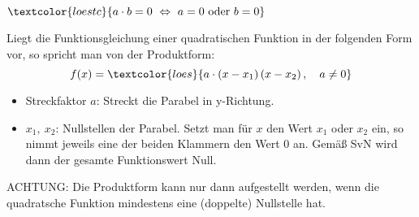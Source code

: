 \setlength{\qrheight}{2.5cm}%
\newlength{\produktbox}
\iftoggle{qrcode}{\setlength{\produktbox}{\textwidth-\qrheight}}{\setlength{\produktbox}{\textwidth}}%
%
\iftoggle{qrcode}{%
    \adjustbox{valign=t, min height=\qrheight, max height = \qrheight}{\href{https://www.geogebra.org/m/weczkmhe}{\texttt{[image: \\quadFkt/pics/ProduktformQR.png]}}}%
}{}%
\begin{tcolorbox}\centering
	\(\textcolor{loestc}{a\cdot b=0\ \Leftrightarrow\ a=0\text{ oder }b=0}\)
\end{tcolorbox}
Liegt die Funktionsgleichung einer quadratischen Funktion in der folgenden Form vor, so spricht man von der Produktform:
\[f(x)=\textcolor{loes}{a\cdot \left(x-x_1\right)\left(x-x_2\right), \quad a\neq 0}\]
\begin{itemize}
	\item Streckfaktor \(a\): \textcolor{loes}{Streckt die Parabel in y-Richtung.}\vspace{0.8cm}
	\item \(x_1,\ x_2\): \textcolor{loes}{Nullstellen der Parabel. Setzt man für \(x\) den Wert \(x_1\) oder \(x_2\) ein, so nimmt jeweils eine der beiden Klammern den Wert 0 an. Gemäß SvN wird dann der gesamte Funktionswert Null.}\vspace{0.8cm}
\end{itemize}
\begin{tcolorbox}\centering
	\textcolor{loestc}{ACHTUNG: Die Produktform kann nur dann aufgestellt werden, wenn die quadratsche Funktion mindestens eine (doppelte) Nullstelle hat.}
\end{tcolorbox}

